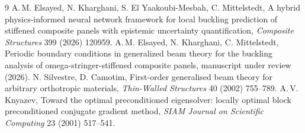 \documentclass[11pt,a4paper]{article}
\begin{document}
\begin{thebibliography}{9}\small
{} A.\,M. Elsayed, N. Kharghani, S. El Yaakoubi-Mesbah, C. Mittelstedt, A hybrid physics-informed neural network framework for local buckling prediction of stiffened composite panels with epistemic uncertainty quantification, \emph{Composite Structures} 399 (2026) 120959.
 A.\,M. Elsayed, N. Kharghani, C. Mittelstedt, Periodic boundary conditions in generalized beam theory for the buckling analysis of omega-stringer-stiffened composite panels, manuscript under review (2026).
 N. Silvestre, D. Camotim, First-order generalised beam theory for arbitrary orthotropic materials, \emph{Thin-Walled Structures} 40 (2002) 755--789.
 A.\,V. Knyazev, Toward the optimal preconditioned eigensolver: locally optimal block preconditioned conjugate gradient method, \emph{SIAM Journal on Scientific Computing} 23 (2001) 517--541.
\end{thebibliography}
\end{document}
